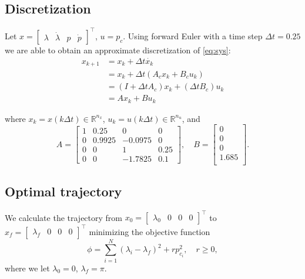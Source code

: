 \subsection{Discretization}
Let $x = \begin{bmatrix}\lambda&\dot{\lambda}&p&\dot{p}\end{bmatrix}^\top$, $u = p_c$. Using forward Euler with a time step $\Delta t = 0.25$ we are able to obtain an approximate discretization of \eqref{eq:sys}:
\begin{subequations}
\label{eq:dmodel}
\begin{align}
	x_{k+1} &= x_k + \Delta t \dot{x_k} \\
			&= x_k + \Delta t (A_c x_k + B_c u_k)\\
			&= (I + \Delta t A_c) x_k + (\Delta t B_c) u_k \\
			&= A x_k + B u_k
\end{align}
\end{subequations}

where $x_k = x(k\Delta t) \in \mathbb{R}^{n_x}$, $u_k = u(k\Delta t)\in \mathbb{R}^{n_u}$, and
\begin{equation}
	A = 
	\begin{bmatrix}
		1 & 0.25 & 0 & 0 \\
		0 & 0.9925 & -0.0975 & 0 \\
		0 & 0 & 1 & 0.25 \\
		0 & 0 & -1.7825 & 0.1
	\end{bmatrix}, \quad
	B = 
	\begin{bmatrix}
		0 \\
		0 \\
		0 \\
		1.685 \\
	\end{bmatrix}.
\end{equation}

\subsection{Optimal trajectory}

We calculate the trajectory from $x_0 = \begin{bmatrix}\lambda_0&0&0&0\end{bmatrix}^\top$ to $x_f = \begin{bmatrix}\lambda_f&0&0&0\end{bmatrix}^\top$ minimizing the objective function 
\begin{equation}
\label{eq:QC_p}
	\phi = \sum_{i=1}^{N}(\lambda_i - \lambda_f)^2 + rp^2_{c_i}, \quad r \ge 0,
\end{equation}
where we let $\lambda_0 = 0$, $\lambda_f = \pi$.

